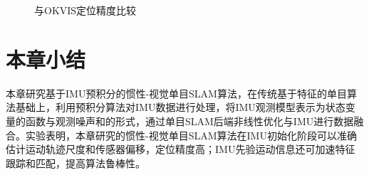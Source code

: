 \begin{figure}[H]
    \centering
     \caption{与OKVIS定位精度比较}
\label{fig5.4}
\end{figure}   



\section{本章小结}
本章研究基于IMU预积分的惯性-视觉单目SLAM算法，在传统基于特征的单目算法基础上，利用预积分算法对IMU数据进行处理，将IMU观测模型表示为状态变量的函数与观测噪声和的形式，通过单目SLAM后端非线性优化与IMU进行数据融合。实验表明，本章研究的惯性-视觉单目SLAM算法在IMU初始化阶段可以准确估计运动轨迹尺度和传感器偏移，定位精度高；IMU先验运动信息还可加速特征跟踪和匹配，提高算法鲁棒性。




